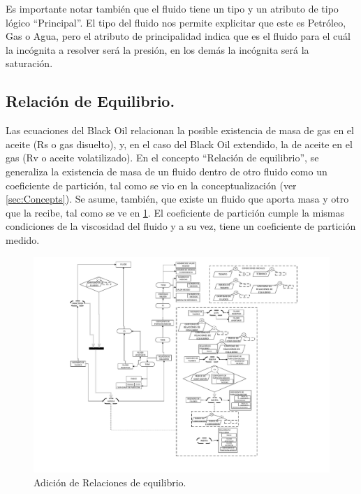 Es importante notar también que el fluido tiene un tipo y un atributo de tipo lógico ``Principal''. El tipo del fluido nos permite explicitar que este es Petróleo, Gas o Agua, pero el atributo de principalidad indica que es el fluido para el cuál la incógnita a resolver será la presión, en los demás la incógnita será la saturación.

\subsection{Relación de Equilibrio.}\label{sec:PS_Equilibrium}
Las ecuaciones del Black Oil relacionan la posible existencia de masa de gas en el aceite (Rs o gas disuelto), y, en el caso del Black Oil extendido, la de aceite en el gas (Rv o aceite volatilizado). En el concepto ``Relación de equilibrio'', se generaliza la existencia de masa de un fluido dentro de otro fluido como un coeficiente de partición, tal como se vio en la conceptualización (ver \ref{sec:Concepts}). Se asume, también, que existe un fluido que aporta masa y otro que la recibe, tal como se ve en \ref{fig:EqRelation}. El coeficiente de partición cumple la mismas condiciones de la viscosidad del fluido y a su vez, tiene un coeficiente de partición medido. 

\begin{figure}[h]
	\centering%
	\includegraphics[width=0.9\linewidth]{Kap4/Equilibrium.pdf}%
	\caption{Adición de Relaciones de equilibrio.} \label{fig:EqRelation}
\end{figure}


